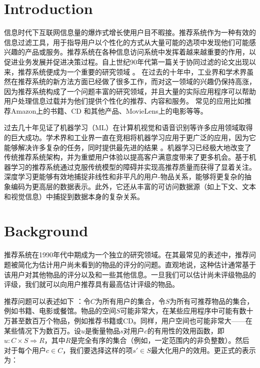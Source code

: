 \documentclass[sigconf]{acmart}
\begin{document}
\maketitle

\section{Introduction}

信息时代下互联网信息量的爆炸式增长使用户目不暇接。推荐系统作为一种有效的信息过滤工具，用于指导用户以个性化的方式从大量可能的选项中发现他们可能感兴趣的产品或服务。推荐系统在各种信息访问系统中发挥着越来越重要的作用，以促进业务发展并促进决策过程。自上世纪90年代第一篇关于协同过滤的论文出现以来，推荐系统便成为一个重要的研究领域 \cite{hill1995recommending, resnick1994grouplens, shardanand1995social}。 在过去的十年中，工业界和学术界虽然在推荐系统的新方法方面已经做了很多工作，而对这一领域的兴趣仍保持高涨，因为推荐系统构成了一个问题丰富的研究领域，并且大量的实际应用程序可以帮助用户处理信息过载并为他们提供个性化的推荐、内容和服务。 常见的应用比如推荐Amazon上的书籍、CD 和其他产品、MovieLens上的电影等等。

过去几十年见证了机器学习（ML）在计算机视觉和语音识别等许多应用领域取得的巨大成功。学术界和工业界一直在竞相将机器学习应用于更广泛的应用，因为它能够解决许多复杂的任务，同时提供最先进的结果 \cite{covington2016deep} 。机器学习已经极大地改变了传统推荐系统架构，并为重塑用户体验以提高客户满意度带来了更多机会。基于机器学习的推荐系统通过克服传统模型的障碍并实现高推荐质量而获得了显着关注。深度学习更能够有效地捕捉非线性和非平凡的用户-物品关系，能够将更复杂的抽象编码为更高层的数据表示。此外，它还从丰富的可访问数据源（如上下文、文本和视觉信息）中捕捉到数据本身的复杂关系。

\section{Background}

推荐系统在1990年代中期成为一个独立的研究领域。在其最常见的表述中，推荐问题被简化为估计用户尚未看到的物品的评分的问题。直观地说，这种估计通常基于该用户对其他物品的评分以及和一些其他信息。一旦我们可以估计尚未评级物品的评级，我们就可以向用户推荐具有最高估计评级的物品。

推荐问题可以表述如下 \cite{adomavicius2005toward}：令$C$为所有用户的集合，令$S$为所有可推荐物品的集合，例如书籍、电影或餐馆。物品的空间$S$可能非常大，在某些应用程序中可能有数十万甚至数百万个物品，例如推荐书籍或CD。同样，用户空间也可能非常大——在某些情况下为数百万。设$u$是衡量物品$s$对用户$c$的有用性的效用函数，即$u: C \times S \Rightarrow R$，其中$R$是完全有序的集合（例如，一定范围内的非负整数）。然后对于每个用户$c\in C$，我们要选择这样的项$s'\in S$最大化用户的效用。更正式的表示为：
\end{document}
